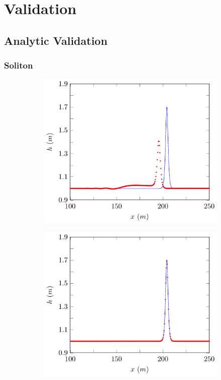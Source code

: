 
\chapter{Validation}
\label{chp:NumMethodComp}

\section{Analytic Validation}

\subsection{Soliton}


\begin{figure}
	\centering
	\begin{subfigure}{0.5\textwidth}
		\includegraphics[width=\textwidth]{./chp5/figures/Analytic/Soliton/Example/FDVM1.pdf}
	\end{subfigure}%
	\begin{subfigure}{0.5\textwidth}
		\includegraphics[width=\textwidth]{./chp5/figures/Analytic/Soliton/Example/FDVM2.pdf}

\end{subfigure}
\end{figure}
